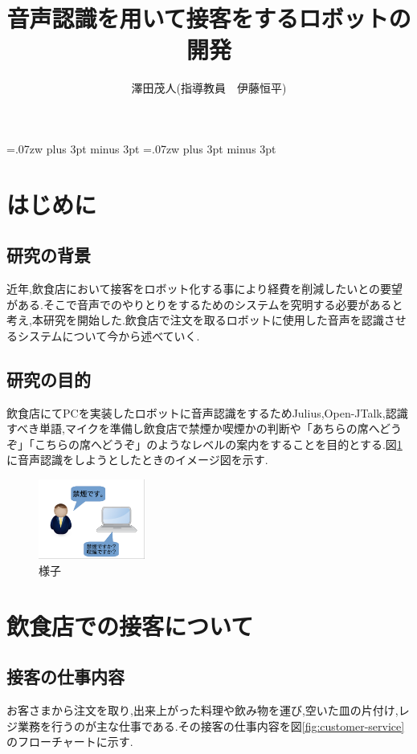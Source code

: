 \documentclass[twocolumn,11pt]{sotsuken_abst}
\title{音声認識を用いて接客をするロボットの開発}
\author{澤田茂人(指導教員　伊藤恒平)}
\begin{document}
\maketitle
\thispagestyle{fancy}
\pagestyle{fancy}

\setlength{\baselineskip}{5.6truemm}
\kanjiskip=.07zw plus 3pt minus 3pt
\xkanjiskip=.07zw plus 3pt minus 3pt


\section{はじめに}
\subsection{研究の背景}
近年,飲食店において接客をロボット化する事により経費を削減したいとの要望がある.そこで音声でのやりとりをするためのシステムを究明する必要があると考え,本研究を開始した.飲食店で注文を取るロボットに使用した音声を認識させるシステムについて今から述べていく.
\subsection{研究の目的}
飲食店にてPCを実装したロボットに音声認識をするためJulius,Open-JTalk,認識すべき単語,マイクを準備し飲食店で禁煙か喫煙かの判断や「あちらの席へどうぞ」「こちらの席へどうぞ」のようなレベルの案内をすることを目的とする.図\ref{fig:yousu}に音声認識をしようとしたときのイメージ図を示す.

\begin{figure}[htbp]
\begin{center}
\includegraphics[width=35mm]{img/Image.png}
\caption{様子}
\label{fig:yousu}
\end{center}
\end{figure}

\section{飲食店での接客について}
\subsection{接客の仕事内容}
お客さまから注文を取り,出来上がった料理や飲み物を運び,空いた皿の片付け,レジ業務を行うのが主な仕事である.その接客の仕事内容を図\ref{fig:customer-service}のフローチャートに示す.
\end{document}
